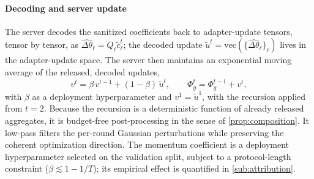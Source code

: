 \documentclass[a4paper,fleqn]{cas-dc}
\begin{document}
\paragraph{Decoding and server update}
The server decodes the sanitized coefficients back to adapter-update tensors, tensor by tensor, as $\widehat{\Delta\theta}_\ell=Q_\ell\tilde c^t_\ell$; the decoded update $\widetilde u^t=\mathrm{vec}(\{\widehat{\Delta\theta}_\ell\}_\ell)$ lives in the adapter-update space. The server then maintains an exponential moving average of the released, decoded updates,
\begin{equation}
v^t=\beta\, v^{t-1}+(1-\beta)\,\widetilde u^t,\qquad
\Phi_g^{t}=\Phi_g^{t-1}+v^t,
\end{equation}
with $\beta$ as a deployment hyperparameter and $v^1=\widetilde u^1$, with the recursion applied from $t=2$. Because the recursion is a deterministic function of already released aggregates, it is budget-free post-processing in the sense of \cref{prop:composition}. It low-pass filters the per-round Gaussian perturbations while preserving the coherent optimization direction. The momentum coefficient is a deployment hyperparameter selected on the validation split, subject to a protocol-length constraint ($\beta\lesssim 1-1/T$); its empirical effect is quantified in \cref{sub:attribution}.
\par
\end{document}
